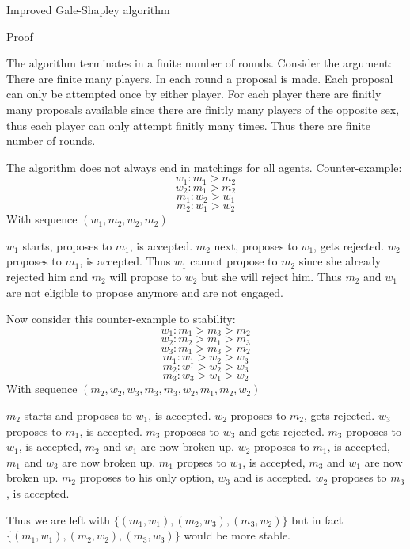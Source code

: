 \documentclass[12pt]{article}
\newenvironment{question}[2][Question]{\begin{trivlist}
\item[\hskip \labelsep {\bfseries #1}\hskip \labelsep {\bfseries #2.}]}{\end{trivlist}}
\newenvironment{answer}[2][Answer]{\begin{trivlist}
\item[\hskip \labelsep {\bfseries #1}\hskip \labelsep {\bfseries #2:}]}{\end{trivlist}}
\begin{document}
\begin{question}{5}
Improved Gale-Shapley algorithm
\end{question}
\begin{answer}{a)}{Proof}

The algorithm terminates in a finite number of rounds. Consider the argument: There are finite many players. In each round a proposal is made. Each proposal can only be attempted once by either player. For each player there are finitly many proposals available since there are finitly many players of the opposite sex, thus each player can only attempt finitly many times. Thus there are finite number of rounds.

The algorithm does not always end in matchings for all agents. Counter-example:
$$w_1:m_1 > m_2$$
$$w_2:m_1 > m_2$$
$$m_1:w_2 > w_1$$
$$m_2:w_1 > w_2$$
With sequence $(w_1,m_2,w_2,m_2)$

$w_1$ starts, proposes to $m_1$, is accepted. $m_2$ next, proposes to $w_1$, gets rejected. $w_2$ proposes to $m_1$, is accepted. Thus $w_1$ cannot propose to $m_2$ since she already rejected him and $m_2$ will propose to $w_2$ but she will reject him. Thus $m_2$ and $w_1$ are not eligible to propose anymore and are not engaged.

Now consider this counter-example to stability:
$$w_1:m_1 > m_3 > m_2$$
$$w_2:m_2 > m_1 > m_3$$
$$w_3:m_1 > m_3 > m_2$$
$$m_1:w_1 > w_2 > w_3$$
$$m_2:w_1 > w_2 > w_3$$
$$m_3:w_3 > w_1 > w_2$$
With sequence $(m_2,w_2,w_3,m_3,m_3,w_2,m_1,m_2,w_2)$

$m_2$ starts and proposes to $w_1$, is accepted. $w_2$ proposes to $m_2$, gets rejected. $w_3$ proposes to $m_1$, is accepted. $m_3$ proposes to $w_3$ and gets rejected. $m_3$ proposes to $w_1$, is accepted, $m_2$ and $w_1$ are now broken up. $w_2$ proposes to $m_1$, is accepted, $m_1$ and $w_3$ are now broken up. $m_1$ propses to $w_1$, is accepted, $m_3$ and $w_1$ are now broken up. $m_2$ proposes to his only option, $w_3$ and is accepted. $w_2$ proposes to $m_3$, is accepted.

Thus we are left with $\{(m_1, w_1), (m_2, w_3), (m_3, w_2)\}$ but in fact $\{(m_1, w_1), (m_2, w_2), (m_3, w_3)\}$ would be more stable.

\end{answer}
\end{document}
